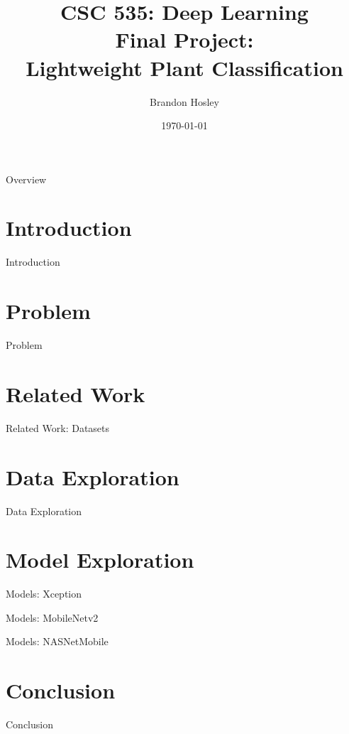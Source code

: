 \documentclass{beamer}
\title{CSC 535: Deep Learning \\ Final Project: \\ Lightweight Plant Classification}
\author{Brandon Hosley}
\institute{University of Illinois - Springfield}
\date{\today}
\begin{document}
\frame{\titlepage}

\begin{frame}{Overview}
\tableofcontents
\end{frame}

\section[Intro]{Introduction}
\begin{frame}{Introduction}

\end{frame}

\section[Problem]{Problem}
\begin{frame}{Problem}

\end{frame}

\section[RW]{Related Work}
\begin{frame}{Related Work: Datasets}

\end{frame}

\section[Data]{Data Exploration}
\begin{frame}{Data Exploration}

\end{frame}

\section[Models]{Model Exploration}
\begin{frame}{Models: Xception}

\end{frame}
\begin{frame}{Models: MobileNetv2}

\end{frame}
\begin{frame}{Models: NASNetMobile}

\end{frame}

\section[Conclusion]{Conclusion}
\begin{frame}{Conclusion}

\end{frame}
\end{document}
